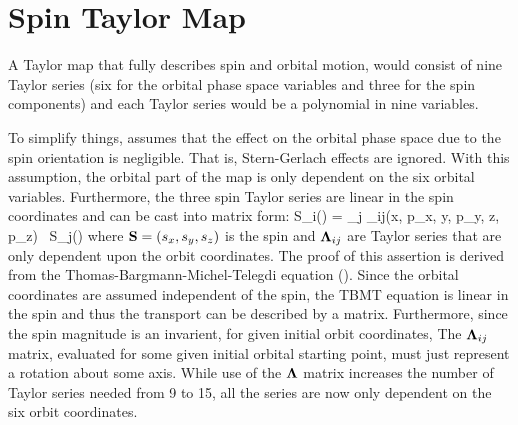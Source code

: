 \section{Spin Taylor Map}
\label{s:spin.map}

A Taylor map that fully describes spin and orbital motion, would
consist of nine Taylor series (six for the orbital phase space
variables and three for the spin components) and each Taylor series
would be a polynomial in nine variables.

To simplify things, \bmad assumes that the effect on the orbital phase
space due to the spin orientation is negligible. That is, Stern-Gerlach
effects are ignored. With this assumption, the orbital part of the map
is only dependent on the six orbital variables. Furthermore, 
the three spin Taylor series are linear in the spin coordinates
and can be cast into matrix form:
\Begineq
  S_i(\Out) = \sum_{j} \Bf\Lambda_{ij}(x, p_x, y, p_y, z, p_z) \, S_j(\In)
\Endeq
where ${\bf S} = (s_x, s_y, s_z)$ is the spin and ${\bf \Lambda}_{ij}$ are
Taylor series that are only dependent upon the orbit coordinates. The
proof of this assertion is derived from the
Thomas-Bargmann-Michel-Telegdi equation (). Since the
orbital coordinates are assumed independent of the spin, the TBMT
equation is linear in the spin and thus the transport can be described
by a matrix. Furthermore, since the spin magnitude is an invarient,
for given initial orbit coordinates, The ${\bf \Lambda}_{ij}$ matrix,
evaluated for some given initial orbital starting point, must just
represent a rotation about some axis. While use of the ${\bf \Lambda}$
matrix increases the number of Taylor series needed from 9 to 15, all
the series are now only dependent on the six orbit coordinates.

